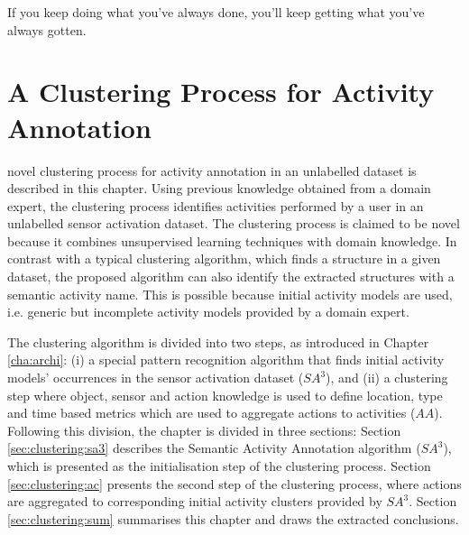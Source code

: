 

\begin{savequote}[50mm]
If you keep doing what you've always done, you'll keep getting what you've always gotten.
\end{savequote}


\chapter{A Clustering Process for Activity Annotation}
\label{cha:clustering}

\ifpdf
    \graphicspath{{4_clustering_process/figures/PDF/}{4_clustering_process/figures/PNG/}{4_clustering_process/figures/}}
\else
    \graphicspath{{4_clustering_process/figures/EPS/}{4_clustering_process/figures/}}
\fi

 novel clustering process for activity annotation in an unlabelled dataset is described in this chapter. Using previous knowledge obtained from a domain expert, the clustering process identifies activities performed by a user in an unlabelled sensor activation dataset. The clustering process is claimed to be novel because it combines unsupervised learning techniques with domain knowledge. In contrast with a typical clustering algorithm, which finds a structure in a given dataset, the proposed algorithm can also identify the extracted structures with a semantic activity name. This is possible because initial activity models are used, i.e. generic but incomplete activity models provided by a domain expert. 

The clustering algorithm is divided into two steps, as introduced in Chapter \ref{cha:archi}: (i) a special pattern recognition algorithm that finds initial activity models' occurrences in the sensor activation dataset ($SA^3$), and (ii) a clustering step where object, sensor and action knowledge is used to define location, type and time based metrics which are used to aggregate actions to activities ($AA$). Following this division, the chapter is divided in three sections: Section \ref{sec:clustering:sa3} describes the Semantic Activity Annotation algorithm ($SA^3$), which is presented as the initialisation step of the clustering process. Section \ref{sec:clustering:ac} presents the second step of the clustering process, where actions are aggregated to corresponding initial activity clusters provided by $SA^3$. Section \ref{sec:clustering:sum} summarises this chapter and draws the extracted conclusions.

